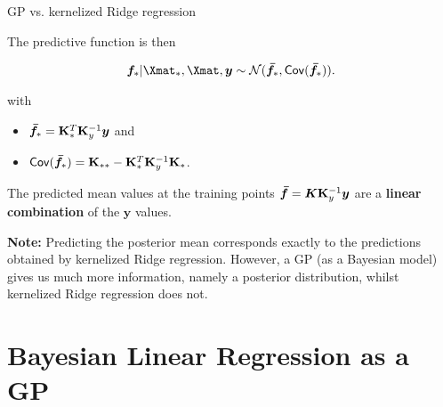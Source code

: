 \begin{vbframe}{GP vs. kernelized Ridge regression} 

The predictive function is then 

\begin{eqnarray*}
\bm{f}_* | \Xmat_*, \Xmat, \yv \sim \mathcal{N}(\bm{\bar f}_*, \cov(\bm{\bar f}_*)).
\end{eqnarray*}

with 

\begin{itemize}
\item $\bm{\bar f}_* = \mathbf{K}_{*}^{T} \mathbf{K}_y^{-1}\bm{y}$ and
\item $\mathsf{Cov}(\bm{\bar f}_*) = \mathbf{K}_{**}- \mathbf{K}_{*}^{T}\mathbf{K}_y^{-1}\mathbf{K}_*$.
\end{itemize}

The predicted mean values at the training points $\bm{\bar f} = \bm{K}\mathbf{K}_y^{-1}\bm{y}$ are a \textbf{linear combination} of the $\bm{y}$ values. 

\lz 

\textbf{Note:} Predicting the posterior mean corresponds exactly to the predictions obtained by kernelized Ridge regression. However, a GP (as a Bayesian model) gives us much more information, namely a posterior distribution, whilst kernelized Ridge regression does not. 


\end{vbframe}




\section{Bayesian Linear Regression as a GP}


